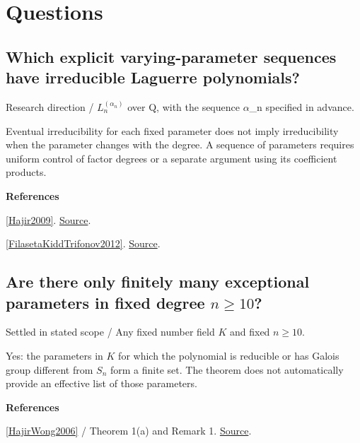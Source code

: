 \documentclass[11pt,a4paper,oneside,openany]{book}
\newenvironment{sources}{\par\smallskip\begingroup\footnotesize\color{atlasgray}\leftskip=10pt\setlength{\parskip}{2pt}}{\par\endgroup\smallskip}
\begin{document}
\section*{Questions}
\subsection*{Which explicit varying-parameter sequences have irreducible Laguerre polynomials?}
{\small\sffamily\color{atlasgold}Research direction / \(L_n^{(\alpha_n)}\) over Q, with the sequence \ensuremath{\alpha}\_\allowbreak{}n specified in advance.}\par\smallskip
\color{black} Eventual irreducibility for each fixed parameter does not imply irreducibility when the parameter changes with the degree. A sequence of parameters requires uniform control of factor degrees or a separate argument using its coefficient products.\par
\begin{sources}
\textbf{References}\par\smallskip
\noindent\hyperlink{ref:Hajir2009}{[Hajir2009]}.  \href{https://doi.org/10.4153/CJM-2009-031-6}{Source}.\par
\noindent\hyperlink{ref:FilasetaKiddTrifonov2012}{[FilasetaKiddTrifonov2012]}.  \href{https://doi.org/10.1016/j.jnt.2011.09.012}{Source}.\par
\end{sources}\color{black}
\subsection*{Are there only finitely many exceptional parameters in fixed degree \(n\ge10\)?}
{\small\sffamily\color{atlasgold}Settled in stated scope / Any fixed number field \(K\) and fixed \(n\ge10\).}\par\smallskip
\color{black} Yes: the parameters in \(K\) for which the polynomial is reducible or has Galois group different from \(S_n\) form a finite set. The theorem does not automatically provide an effective list of those parameters.\par
\begin{sources}
\textbf{References}\par\smallskip
\noindent\hyperlink{ref:HajirWong2006}{[HajirWong2006]} / Theorem 1(a) and Remark 1.  \href{https://www.numdam.org/item/AIF_2006__56_4_1127_0/}{Source}.\par
\end{sources}\color{black}
\end{document}
